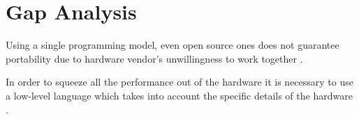 \chapter{Gap Analysis} \label{ch:GapAnalysis}

Using a single programming model, even open source ones does not guarantee portability due to hardware vendor's unwillingness to work together \cite{but_mummy_cuda}.

In order to squeeze all the performance out of the hardware it is necessary to use a low-level language which takes into account the specific details of the hardware \cite{cuda_open_source_compiler}.